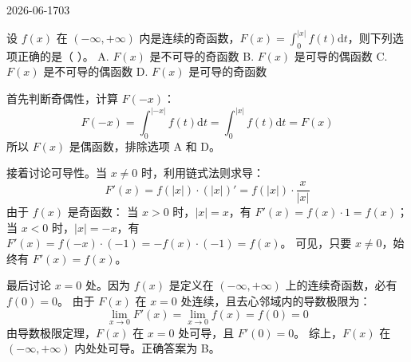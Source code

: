 \begin{mistake}{2026-06-17}{03}

\begin{problemcontent}
设 \(f(x)\) 在 \((-\infty, +\infty)\) 内是连续的奇函数，\(F(x) = \int_0^{|x|} f(t)\text{d}t\)，则下列选项正确的是（  ）。
A. \(F(x)\) 是不可导的奇函数
B. \(F(x)\) 是可导的偶函数
C. \(F(x)\) 是不可导的偶函数
D. \(F(x)\) 是可导的奇函数
\end{problemcontent}

\begin{solutioncontent}
首先判断奇偶性，计算 \(F(-x)\)：
\[ F(-x) = \int_0^{|-x|} f(t)\text{d}t = \int_0^{|x|} f(t)\text{d}t = F(x) \]
所以 \(F(x)\) 是偶函数，排除选项 A 和 D。

接着讨论可导性。当 \(x \neq 0\) 时，利用链式法则求导：
\[ F'(x) = f(|x|) \cdot (|x|)' = f(|x|) \cdot \frac{x}{|x|} \]
由于 \(f(x)\) 是奇函数：
当 \(x > 0\) 时，\(|x|=x\)，有 \(F'(x) = f(x) \cdot 1 = f(x)\)；
当 \(x < 0\) 时，\(|x|=-x\)，有 \(F'(x) = f(-x) \cdot (-1) = -f(x) \cdot (-1) = f(x)\)。
可见，只要 \(x \neq 0\)，始终有 \(F'(x) = f(x)\)。

最后讨论 \(x = 0\) 处。因为 \(f(x)\) 是定义在 \((-\infty, +\infty)\) 上的连续奇函数，必有 \(f(0) = 0\)。
由于 \(F(x)\) 在 \(x=0\) 处连续，且去心邻域内的导数极限为：
\[ \lim_{x \to 0} F'(x) = \lim_{x \to 0} f(x) = f(0) = 0 \]
由导数极限定理，\(F(x)\) 在 \(x=0\) 处可导，且 \(F'(0) = 0\)。
综上，\(F(x)\) 在 \((-\infty, +\infty)\) 内处处可导。正确答案为 B。
\end{solutioncontent}


\end{mistake}
